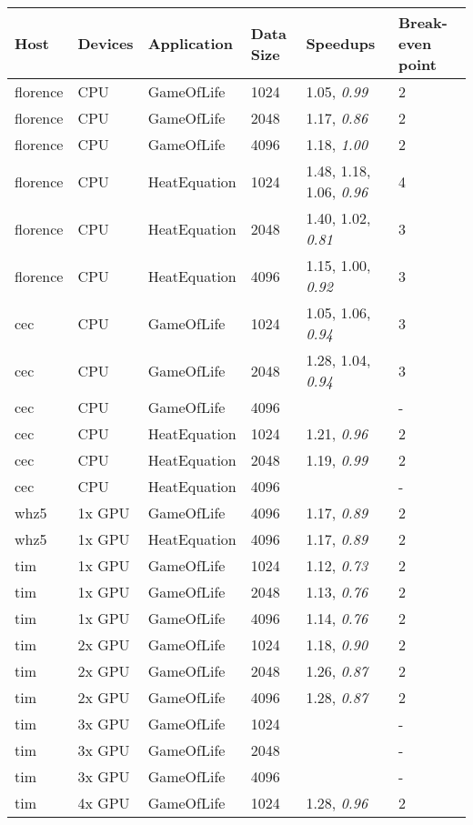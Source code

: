\begin{tabular}{| l | l | l | l | l | l |}
\hline
\textbf{Host} & \textbf{Devices} & \textbf{Application} & \textbf{Data Size} & \textbf{Speedups} & \textbf{Break-even point}\\
\hline
florence & CPU & GameOfLife & 1024 & 1.05, \textit{0.99} & 2 \\
florence & CPU & GameOfLife & 2048 & 1.17, \textit{0.86} & 2 \\
florence & CPU & GameOfLife & 4096 & 1.18, \textit{1.00} & 2 \\
florence & CPU & HeatEquation & 1024 & 1.48, 1.18, 1.06, \textit{0.96} & 4 \\
florence & CPU & HeatEquation & 2048 & 1.40, 1.02, \textit{0.81} & 3 \\
florence & CPU & HeatEquation & 4096 & 1.15, 1.00, \textit{0.92} & 3 \\
cec & CPU & GameOfLife & 1024 & 1.05, 1.06, \textit{0.94} & 3 \\
cec & CPU & GameOfLife & 2048 & 1.28, 1.04, \textit{0.94} & 3 \\
cec & CPU & GameOfLife & 4096 &  & - \\
cec & CPU & HeatEquation & 1024 & 1.21, \textit{0.96} & 2 \\
cec & CPU & HeatEquation & 2048 & 1.19, \textit{0.99} & 2 \\
cec & CPU & HeatEquation & 4096 &  & - \\
whz5 & 1x GPU & GameOfLife & 4096 & 1.17, \textit{0.89} & 2 \\
whz5 & 1x GPU & HeatEquation & 4096 & 1.17, \textit{0.89} & 2 \\
tim & 1x GPU & GameOfLife & 1024 & 1.12, \textit{0.73} & 2 \\
tim & 1x GPU & GameOfLife & 2048 & 1.13, \textit{0.76} & 2 \\
tim & 1x GPU & GameOfLife & 4096 & 1.14, \textit{0.76} & 2 \\
tim & 2x GPU & GameOfLife & 1024 & 1.18, \textit{0.90} & 2 \\
tim & 2x GPU & GameOfLife & 2048 & 1.26, \textit{0.87} & 2 \\
tim & 2x GPU & GameOfLife & 4096 & 1.28, \textit{0.87} & 2 \\
tim & 3x GPU & GameOfLife & 1024 &  & - \\
tim & 3x GPU & GameOfLife & 2048 &  & - \\
tim & 3x GPU & GameOfLife & 4096 &  & - \\
tim & 4x GPU & GameOfLife & 1024 & 1.28, \textit{0.96} & 2 \\

\end{tabular}
